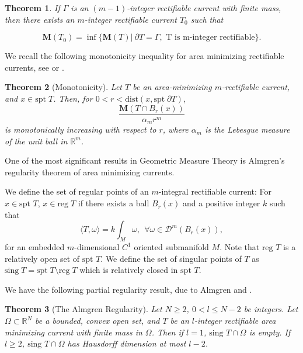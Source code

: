 \documentclass{amsart}
\numberwithin{equation}{section}
\newtheorem{theorem}{Theorem}[section]
\theoremstyle{definition}
\theoremstyle{remark}
\begin{document}
\begin{theorem} If $\Gamma$ is an $(m-1)$-integer rectifiable current {{with finite mass}}, 
then there exists an $m$-integer rectifiable current $T_0$ such that

\[ \mathbf{M}(T_0) = \inf \Big\{\mathbf{M}(T)\big|\  \partial T=\Gamma, \text{ T is m-integer rectifiable} \Big\} .\]
\end{theorem}

We recall the following monotonicity {inequality}
for  area minimizing rectifiable currents, see \cite{Federer} or \cite[Theorem 9.3]{Morgan}.

\begin{theorem}[Monotonicity] 
Let $T$ be an area-minimizing $m$-rectifiable current, and $x \in \text{spt} \; T$. Then, for $0 < r < \text{dist}(x, \text{spt} \; \partial T)$, 
\[ \frac{\mathbf{M}(T \cap B_r(x))}{\alpha_m r^m}\]
is monotonically increasing with respect to $r$, where $\alpha_m$ is the Lebesgue measure of the unit ball in $\mathbb{R}^m$.
\end{theorem}

One of the most significant results in Geometric Measure Theory is Almgren's  regularity 
{theorem} of area minimizing currents.

We define the set of regular points of {an $m$-integral rectifiable} current: 
For $x \in \text{spt }T$, $x \in \text{reg} \; T$ if there exists {a}
ball $B_r(x)$ and a positive integer $k$ such that
\[ \langle T, \omega \rangle = k \int_M \omega,\  {\ \forall \omega\in \mathcal{D}^m(B_r(x))},\]
for an embedded $m$-dimensional $C^1$ oriented submanifold $M$. 
Note that $\text{reg }T$ is a relatively open set of $\text{spt } T$.  We define the set of singular points of $T$ as $ \text{sing} \; T = \text{spt} \; T \setminus \text{reg} \; T$ which is relatively closed in $\text{spt } T$. 

We have the following partial regularity result, due to Almgren \cite{Almgren} and \cite{Lellis}.

\begin{theorem} [The Almgren Regularity] \textit{ Let $N \geq 2$, $0 < l \leq N-2$ be integers. Let $\Omega \subset \mathbb{R}^N $ be 
{a bounded, convex open set}, and $T$ be an $l$-integer rectifiable area minimizing current with finite mass in $\Omega$. Then if $l =1$,} $\text{sing } T \cap \Omega$\textit{ is empty. If $l \geq 2$}, $\text{sing }T \cap \Omega$ \textit{has 
Hausdorff dimension at most $l-2$}.
\end{theorem}
\end{document}
